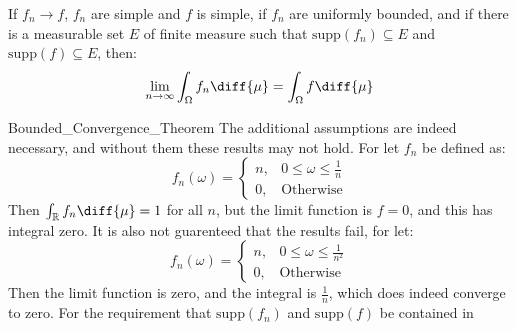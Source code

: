                \begin{theorem}
                    If $f_{n}\rightarrow{f}$, $f_{n}$ are
                    simple and $f$ is simple, if
                    $f_{n}$ are uniformly bounded, and if
                    there is a measurable set $E$ of finite
                    measure such that $\mathrm{supp}(f_{n})\subseteq{E}$
                    and $\mathrm{supp}(f)\subseteq{E}$, then:
                    \begin{equation}
                        \underset{n\rightarrow\infty}{\lim}
                        \int_{\Omega}f_{n}\diff{\mu}
                        =\int_{\Omega}f\diff{\mu}
                    \end{equation}
                \end{theorem}
                \begin{lexample}{}{Bounded_Convergence_Theorem}
                    The additional assumptions are indeed
                    necessary, and without them these results
                    may not hold. For let $f_{n}$ be defined as:
                    \begin{equation}
                        f_{n}(\omega)=
                        \begin{cases}
                            n,&0\leq\omega\leq\frac{1}{n}\\
                            0,&\textrm{Otherwise}
                        \end{cases}
                    \end{equation}
                    Then $\int_{\mathbb{R}}f_{n}\diff{\mu}=1$
                    for all $n$, but the limit function is
                    $f=0$, and this has integral zero. It is
                    also not guarenteed that the results
                    fail, for let:
                    \begin{equation}
                        f_{n}(\omega)=
                        \begin{cases}
                            n,&0\leq\omega\leq\frac{1}{n^{2}}\\
                            0,&\textrm{Otherwise}
                        \end{cases}
                    \end{equation}
                    Then the limit function is zero, and the
                    integral is $\frac{1}{n}$, which does indeed
                    converge to zero. For the requirement that
                    $\mathrm{supp}(f_{n})$ and $\mathrm{supp}(f)$ be contained in

\end{lexample}
